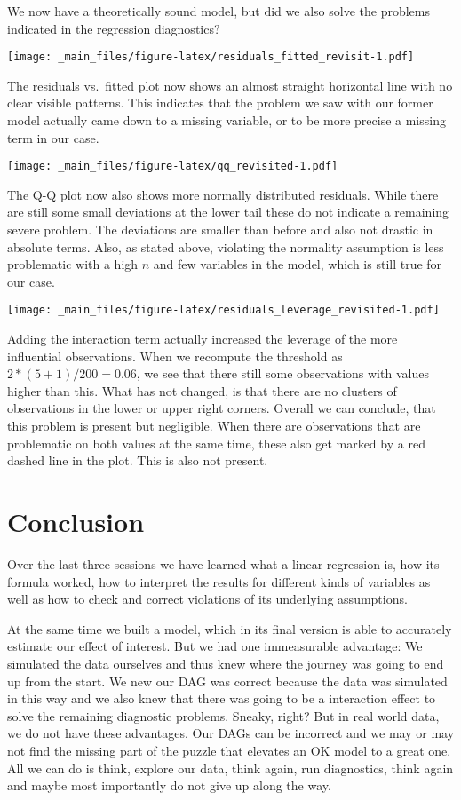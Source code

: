 \documentclass[
]{book}
\begin{document}
We now have a theoretically sound model, but did we also solve the problems
indicated in the regression diagnostics?

\texttt{[image: \_main\_files/figure-latex/residuals\_fitted\_revisit-1.pdf]}

The residuals vs.~fitted plot now shows an almost straight horizontal line with
no clear visible patterns.
This indicates that the problem we saw with our former model actually came down
to a missing variable, or to be more precise a missing term in our case.

\texttt{[image: \_main\_files/figure-latex/qq\_revisited-1.pdf]}

The Q-Q plot now also shows more normally distributed residuals. While there are
still some small deviations at the lower tail these do not indicate a remaining
severe problem. The deviations are smaller than before and also not drastic in
absolute terms. Also, as stated above, violating the normality assumption is less
problematic with a high \(n\) and few variables in the model, which is still true for
our case.

\texttt{[image: \_main\_files/figure-latex/residuals\_leverage\_revisited-1.pdf]}

Adding the interaction term actually increased the leverage of the more
influential observations. When we recompute the threshold as
\(2 * (5 + 1) / 200 = 0.06\), we see that there still some observations with
values higher than this. What has not changed, is that there are no clusters
of observations in the lower or upper right corners. Overall we can conclude,
that this problem is present but negligible. When there are observations that
are problematic on both values at the same time, these also get marked by a red
dashed line in the plot. This is also not present.

\hypertarget{conclusion}{%
\section{Conclusion}\label{conclusion}}

Over the last three sessions we have learned what a linear regression is, how
its formula worked, how to interpret the results for different kinds of
variables as well as how to check and correct violations of its underlying
assumptions.

At the same time we built a model, which in its final version is able to
accurately estimate our effect of interest. But we had one immeasurable
advantage: We simulated the data ourselves and thus knew where the journey was
going to end up from the start. We new our DAG was correct because the data was
simulated in this way and we also knew that there was going to be a interaction
effect to solve the remaining diagnostic problems. Sneaky, right? But in real
world data, we do not have these advantages. Our DAGs can be incorrect and we
may or may not find the missing part of the puzzle that elevates an OK model to
a great one. All we can do is think, explore our data, think again, run
diagnostics, think again and maybe most importantly do not give up along the
way.
\end{document}
